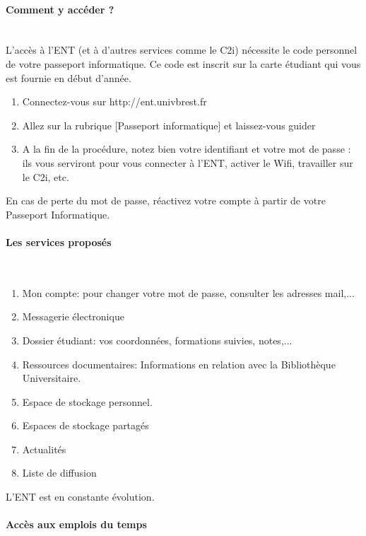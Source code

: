 \documentclass[11pt]{article}
\begin{document}
{{\begin{multicols*}{2}
\paragraph{Comment y accéder ?}~\\


L'accès à l'ENT (et à d'autres services comme le C2i) nécessite le code personnel de votre passeport informatique.
Ce code est inscrit sur la carte étudiant qui vous est fournie en début d'année.
\noindent
\begin{center}
\end{center}
\begin{enumerate}
\item Connectez-vous sur http://ent.univbrest.fr
\item Allez sur la rubrique [Passeport informatique] et laissez-vous guider
\item A la fin de la procédure, notez bien votre identifiant et votre mot de passe : ils vous serviront pour vous connecter à l'ENT, activer le Wifi, travailler sur le C2i, etc.
\end{enumerate}
En cas de perte du mot de passe, réactivez votre compte à partir de votre Passeport Informatique.
\paragraph{Les services proposés}~\\
\begin{enumerate}
\item Mon compte: pour changer votre mot de passe, consulter les adresses mail,...
\item Messagerie électronique
\item Dossier étudiant: vos coordonnées, formations suivies, notes,...
\item Ressources documentaires: Informations en relation avec la Bibliothèque Universitaire.
\item Espace de stockage personnel.
\item Espaces de stockage partagés
\item Actualités
\item Liste de diffusion
\end{enumerate}
L'ENT est en constante évolution.

\paragraph{Accès aux emplois du temps}~\\


\end{multicols*}}}
\end{document}
